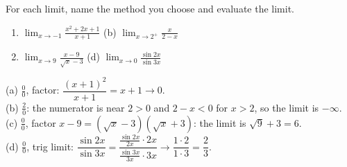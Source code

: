 \begin{exo}{}
For each limit, name the method you choose and evaluate the limit.
\begin{enumerate}[label=(\alph*)]
\item $\displaystyle\lim_{x\to-1}\frac{x^2+2x+1}{x+1}$ \qquad (b) $\displaystyle\lim_{x\to2^+}\frac{x}{2-x}$
\setcounter{enumi}{2}
\item $\displaystyle\lim_{x\to9}\frac{x-9}{\sqrt x-3}$ \qquad (d) $\displaystyle\lim_{x\to0}\frac{\sin 2x}{\sin 3x}$
\end{enumerate}
\begin{solution}
(a) $\frac00$, factor: $\dfrac{(x+1)^2}{x+1}=x+1\to0$.\\
(b) $\frac20$: the numerator is near $2>0$ and $2-x<0$ for $x>2$, so the limit is $-\infty$.\\
(c) $\frac00$, factor $x-9=(\sqrt x-3)(\sqrt x+3)$: the limit is $\sqrt9+3=6$.\\
(d) $\frac00$, trig limit: $\dfrac{\sin2x}{\sin3x}=\dfrac{\frac{\sin2x}{2x}\cdot2x}{\frac{\sin3x}{3x}\cdot3x}\to\dfrac{1\cdot2}{1\cdot3}=\dfrac23$.
\end{solution}
\end{exo}

